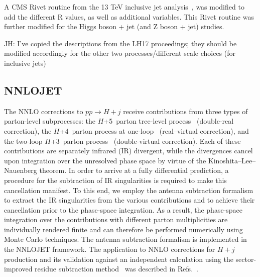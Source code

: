 \documentclass[aps,prd,onecolumn,fleqn,superscriptaddress,groupedaddress,nofootinbib,preprintnumbers,nobalancelastpage]{revtex4}
\begin{document}
A CMS Rivet routine from the 13 TeV  inclusive jet analysis~\cite{Khachatryan:2016wdh}, was
modified to add the different R values, as well as additional variables. This
Rivet routine was further modified for the Higgs boson + jet (and Z boson + jet)
studies. 

JH: I've copied the descriptions from the LH17 proceedings; they should be modified accordingly for the other two processes/different scale choices (for inclusive jets)

\subsection{NNLOJET}

The NNLO corrections to $pp \to H+j$ receive contributions from three types of
parton-level subprocesses: the $H$+5~parton tree-level
process~\cite{DelDuca:2004wt,Dixon:2004za,Badger:2004ty} (double-real
correction), the $H$+4~parton process at
one-loop~\cite{Badger:2009hw,Badger:2009vh,Dixon:2009uk} (real--virtual
correction), and the two-loop $H$+3~parton process~\cite{Gehrmann:2011aa}
(double-virtual correction).  Each of these contributions are separately
infrared (IR) divergent, while the divergences cancel upon integration over the
unresolved phase space by virtue of the Kinoshita--Lee--Nauenberg theorem.  In
order to arrive at a fully differential prediction, a procedure for the
subtraction of IR singularities is required to make this cancellation manifest.
To this end, we employ the antenna subtraction
formalism~\cite{GehrmannDeRidder:2005cm,GehrmannDeRidder:2005aw,GehrmannDeRidder:2005hi,Daleo:2006xa,Daleo:2009yj,Gehrmann:2011wi,
Boughezal:2010mc,GehrmannDeRidder:2012ja,Currie:2013vh} to extract the IR
singularities from the various contributions and to achieve their cancellation
prior to the phase-space integration.  As a result, the phase-space integration
over the contributions with different parton multiplicities are individually
rendered finite and can therefore be performed numerically using Monte Carlo
techniques.  The antenna subtraction formalism is implemented in the 
NNLOJET
framework. The application to NNLO corrections for $H+j$ production and its
validation against an independent calculation using the sector-improved residue
subtraction method~\cite{Boughezal:2015dra} was described in
Refs.~\cite{Chen:2014gva,Chen:2016vqn,deFlorian:2016spz}. 
\end{document}

